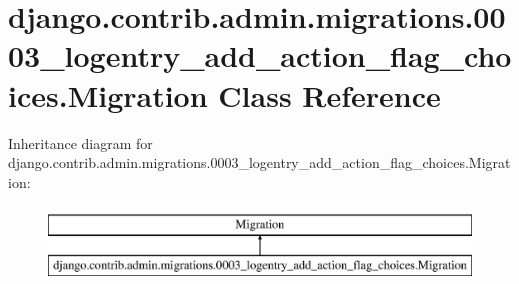 \hypertarget{classdjango_1_1contrib_1_1admin_1_1migrations_1_10003__logentry__add__action__flag__choices_1_1_migration}{}\section{django.\+contrib.\+admin.\+migrations.0003\+\_\+logentry\+\_\+add\+\_\+action\+\_\+flag\+\_\+choices.Migration Class Reference}
\label{classdjango_1_1contrib_1_1admin_1_1migrations_1_10003__logentry__add__action__flag__choices_1_1_migration}
Inheritance diagram for django.\+contrib.\+admin.\+migrations.0003\+\_\+logentry\+\_\+add\+\_\+action\+\_\+flag\+\_\+choices.Migration\+:\begin{figure}[H]
\begin{center}
\leavevmode
\includegraphics[height=2.000000cm]{classdjango_1_1contrib_1_1admin_1_1migrations_1_10003__logentry__add__action__flag__choices_1_1_migration}
\end{center}
\end{figure}
